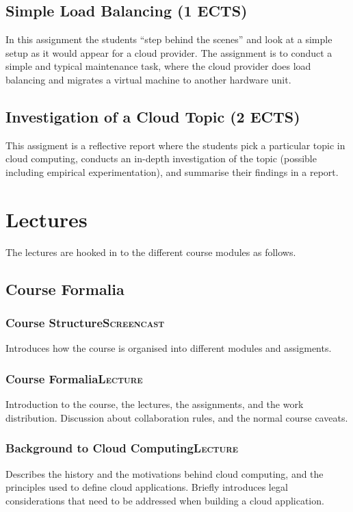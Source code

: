 \documentclass[11pt]{article}
\begin{document}
\subsection{Simple Load Balancing (1 ECTS)}
\label{sec-2-3}
In this assignment the students ``step behind the scenes'' and look at a simple setup as it would appear for a cloud provider. The assignment is to conduct a simple and typical maintenance task, where the cloud provider does load balancing and migrates a virtual machine to another hardware unit.
\subsection{Investigation of a Cloud Topic (2 ECTS)}
\label{sec-2-4}
This assigment is a reflective report where the students pick a particular topic in cloud computing, conducts an in-depth investigation of the topic (possible including empirical experimentation), and summarise their findings in a report.
\section{Lectures}
\label{sec-3}
The lectures are hooked in to the different course modules as follows.
\subsection{Course Formalia}
\label{sec-3-1}
\subsubsection[Course Structure]{Course Structure\hfill{}\textsc{Screencast}}
\label{sec-3-1-1}
Introduces how the course is organised into different modules and assigments.
\subsubsection[Course Formalia]{Course Formalia\hfill{}\textsc{Lecture}}
\label{sec-3-1-2}
Introduction to the course, the lectures, the assignments, and the work distribution.
Discussion about collaboration rules, and the normal course caveats.
\subsubsection[Background to Cloud Computing]{Background to Cloud Computing\hfill{}\textsc{Lecture}}
\label{sec-3-1-3}
Describes the history and the motivations behind cloud computing, and the principles used to define cloud applications. Briefly introduces legal considerations that need to be addressed when building a cloud application.
\end{document}
